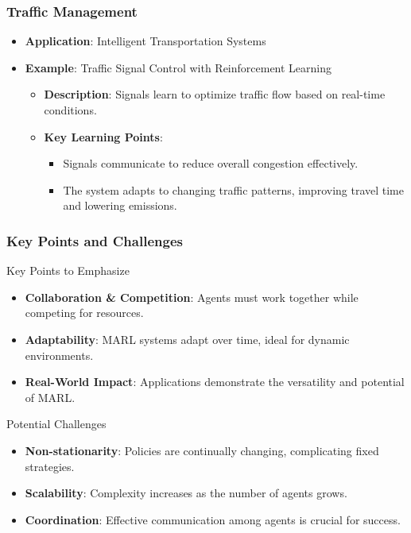 \documentclass[aspectratio=169]{beamer}
\begin{document}
\begin{frame}[fragile]
    \frametitle{Traffic Management}
    \begin{itemize}
        \item \textbf{Application}: Intelligent Transportation Systems
        \item \textbf{Example}: Traffic Signal Control with Reinforcement Learning
        \begin{itemize}
            \item \textbf{Description}: Signals learn to optimize traffic flow based on real-time conditions.
            \item \textbf{Key Learning Points}:
            \begin{itemize}
                \item Signals communicate to reduce overall congestion effectively.
                \item The system adapts to changing traffic patterns, improving travel time and lowering emissions.
            \end{itemize}
        \end{itemize}
    \end{itemize}
\end{frame}

\begin{frame}[fragile]
    \frametitle{Key Points and Challenges}
    \begin{block}{Key Points to Emphasize}
        \begin{itemize}
            \item \textbf{Collaboration \& Competition}: Agents must work together while competing for resources.
            \item \textbf{Adaptability}: MARL systems adapt over time, ideal for dynamic environments.
            \item \textbf{Real-World Impact}: Applications demonstrate the versatility and potential of MARL.
        \end{itemize}
    \end{block}
    
    \begin{block}{Potential Challenges}
        \begin{itemize}
            \item \textbf{Non-stationarity}: Policies are continually changing, complicating fixed strategies.
            \item \textbf{Scalability}: Complexity increases as the number of agents grows.
            \item \textbf{Coordination}: Effective communication among agents is crucial for success.
        \end{itemize}
    \end{block}
\end{frame}
\end{document}
